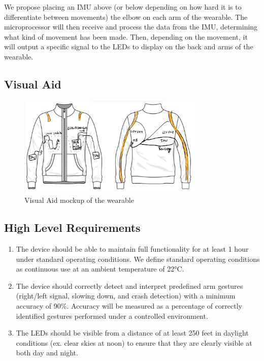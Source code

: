 \documentclass[12pt]{article}
\begin{document}
We propose placing an IMU above (or below depending on how hard 
it is to differentiate between movements) the elbow on each arm 
of the wearable. The microprocessor will then receive and process 
the data from the IMU, determining what kind of movement has been 
made. Then, depending on the movement, it will output a specific 
signal to the LEDs to display on the back and arms of the wearable. 


\subsection{Visual Aid}
\begin{figure}[ht]
    \centering
    \includegraphics[width=0.8\textwidth]{visual_aid.jpg}
    \caption{Visual Aid mockup of the wearable}
    \label{fig:my_label}
\end{figure}
\subsection{High Level Requirements}
\begin{enumerate}
    \item The device should be able to maintain full functionality 
    for at least 1 hour under standard operating conditions. 
    We define standard operating conditions as continuous use 
    at an ambient temperature of 22°C. 

    \item The device should correctly detect and interpret 
    predefined arm gestures (right/left signal, slowing down, and 
    crash detection) with a minimum accuracy of 90\%. Accuracy 
    will be measured as a percentage of correctly identified 
    gestures performed under a controlled environment. 
    \item The LEDs should be visible from a distance of at least 
    250 feet in daylight conditions (ex. clear skies at noon) to ensure that they are clearly visible at both day and night. 

\end{enumerate}
\end{document}
